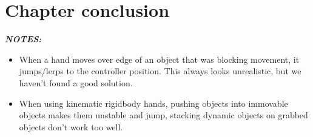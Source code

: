 \section{Chapter conclusion}
\label{sec:CHAPTERCONCLUSION}




\textbf{\textit{NOTES:}}
\begin{itemize}[noitemsep]
\item When a hand moves over edge of an object that was blocking movement, it jumps/lerps to the controller position. This always looks unrealistic, but we haven't found a good solution.
\item When using kinematic rigidbody hands, pushing objects into immovable objects makes them unstable and jump, stacking dynamic objects on grabbed objects don't work too well.
\end{itemize}